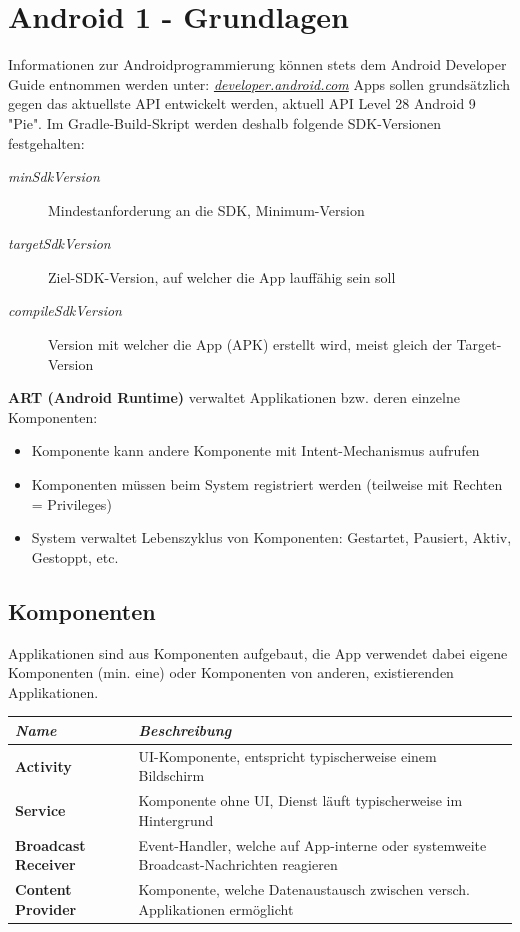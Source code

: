 \documentclass[a4paper]{article}
\begin{document}
\section{Android 1 - Grundlagen}
	Informationen zur Androidprogrammierung können stets dem Android Developer Guide entnommen werden unter: \textit{\href{https://developer.android.com/}{developer.android.com}}
	Apps sollen grundsätzlich gegen das aktuellste API entwickelt werden, aktuell API Level 28 Android 9 "Pie".
	Im Gradle-Build-Skript werden deshalb folgende SDK-Versionen festgehalten:
\vspace{1em}
	\begin{description}
		\item[\textit{minSdkVersion}] Mindestanforderung an die SDK, Minimum-Version
		\item[\textit{targetSdkVersion}] Ziel-SDK-Version, auf welcher die App lauffähig sein soll
		\item[\textit{compileSdkVersion}] Version mit welcher die App (APK) erstellt wird, meist gleich der Target-Version	
	\end{description}
\vspace{1em}
	\textbf{ART (Android Runtime)} verwaltet Applikationen bzw. deren einzelne Komponenten:
	\begin{itemize}
		\item Komponente kann andere Komponente mit Intent-Mechanismus aufrufen
		\item Komponenten müssen beim System registriert werden (teilweise mit Rechten = Privileges)
		\item System verwaltet Lebenszyklus von Komponenten: Gestartet, Pausiert, Aktiv, Gestoppt, etc.
	\end{itemize}

	\subsection{Komponenten}
		Applikationen sind aus Komponenten aufgebaut, die App verwendet dabei eigene Komponenten (min. eine) oder Komponenten von anderen, existierenden Applikationen.
	\begin{table}[h!]
		\begin{tabular}{ l | p{11cm} }
			\textbf{\textit{Name}}               & \textbf{\textit{Beschreibung}} \\
			\hline
			\textbf{Activity}           & UI-Komponente, entspricht typischerweise einem Bildschirm \\
			\textbf{Service}            & Komponente ohne UI, Dienst läuft typischerweise im Hintergrund \\
			\textbf{Broadcast Receiver} & Event-Handler, welche auf App-interne oder systemweite Broadcast-Nachrichten reagieren \\
			\textbf{Content Provider}   & Komponente, welche Datenaustausch zwischen versch. Applikationen ermöglicht
		\end{tabular}
	\end{table}
	
\end{document}
